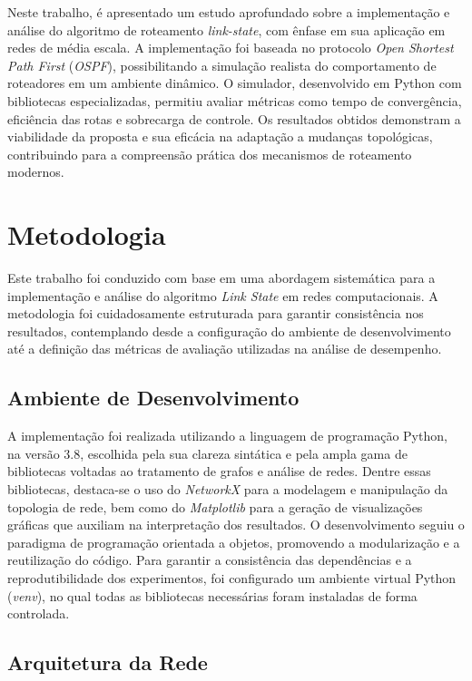 \documentclass[12pt,a4paper]{report}
\begin{document}
Neste trabalho, é apresentado um estudo aprofundado sobre a implementação e análise do algoritmo de roteamento \textit{link-state}, com ênfase em sua aplicação em redes de média escala. A implementação foi baseada no protocolo \textit{Open Shortest Path First} (\textit{OSPF}), possibilitando a simulação realista do comportamento de roteadores em um ambiente dinâmico. O simulador, desenvolvido em Python com bibliotecas especializadas, permitiu avaliar métricas como tempo de convergência, eficiência das rotas e sobrecarga de controle. Os resultados obtidos demonstram a viabilidade da proposta e sua eficácia na adaptação a mudanças topológicas, contribuindo para a compreensão prática dos mecanismos de roteamento modernos.

\chapter{Metodologia}

Este trabalho foi conduzido com base em uma abordagem sistemática para a implementação e análise do algoritmo \textit{Link State} em redes computacionais. A metodologia foi cuidadosamente estruturada para garantir consistência nos resultados, contemplando desde a configuração do ambiente de desenvolvimento até a definição das métricas de avaliação utilizadas na análise de desempenho.

\section{Ambiente de Desenvolvimento}

A implementação foi realizada utilizando a linguagem de programação Python, na versão 3.8, escolhida pela sua clareza sintática e pela ampla gama de bibliotecas voltadas ao tratamento de grafos e análise de redes. Dentre essas bibliotecas, destaca-se o uso do \textit{NetworkX} para a modelagem e manipulação da topologia de rede, bem como do \textit{Matplotlib} para a geração de visualizações gráficas que auxiliam na interpretação dos resultados. O desenvolvimento seguiu o paradigma de programação orientada a objetos, promovendo a modularização e a reutilização do código. Para garantir a consistência das dependências e a reprodutibilidade dos experimentos, foi configurado um ambiente virtual Python (\textit{venv}), no qual todas as bibliotecas necessárias foram instaladas de forma controlada.

\section{Arquitetura da Rede}
\end{document}
